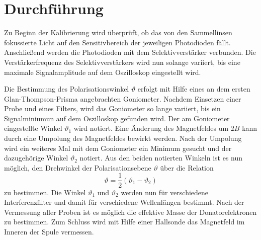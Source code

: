\section{Durchführung}
\label{sec:Durchführung}

Zu Beginn der Kalibrierung wird überprüft, ob das von den Sammellinsen
fokussierte Licht auf den Sensitivbereich der jeweiligen Photodioden fällt.
Anschließend werden die Photodioden mit dem Selektivverstärker verbunden.
Die Verstärkerfrequenz des Selektivverstärkers wird nun solange variiert,
bis eine maximale Signalamplitude auf dem Oszilloskop eingestellt wird.

Die Bestimmung des Polarisationswinkel $\vartheta$ erfolgt mit Hilfe eines
an dem ersten Glan-Thompson-Prisma angebrachten Goniometer. Nachdem Einsetzen einer
Probe und eines Filters, wird das Goniometer so lange variiert, bis ein Signalminiumun
auf dem Oszilloskop gefunden wird. Der am Goniometer eingestellte Winkel $\vartheta_1$ wird
notiert. Eine Änderung des Magnetfeldes um $2B$ kann durch eine Umpolung des
Magnetfeldes bewirkt werden. Nach der Umpolung wird ein weiteres Mal mit dem
Goniometer ein Minimum gesucht und der dazugehörige Winkel $\vartheta_2$ notiert.
Aus den beiden notierten Winkeln ist es nun möglich, den Drehwinkel der Polarisationsebene
$\vartheta$ über die Relation
\begin{equation}
  \label{eq:theta_aus_messung}
  \vartheta = \frac{1}{2}(\vartheta_1 - \vartheta_2)
\end{equation}
zu bestimmen. Die Winkel $\vartheta_1$ und $\vartheta_2$ werden nun für verschiedene
Interferenzfilter und damit für verschiedene Wellenlängen bestimmt.
Nach der Vermessung aller Proben ist es möglich die effektive Masse der Donatorelektronen zu bestimmen.
Zum Schluss wird mit Hilfe einer Hallsonde das Magnetfeld im Inneren der Spule
vermessen.
